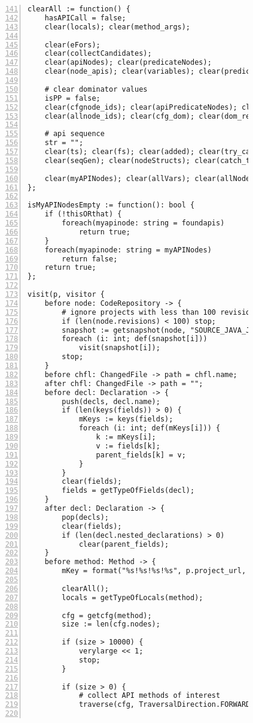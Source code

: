 \begin{figure}[ht!]
\begin{lstlisting}[numbers=left, tabsize=4, escapechar=@, caption={API Usage Mining Analysis},label={lst:aun-code},  firstline = 141, firstnumber = 141, lastline = 201]
clearAll := function() {
    hasAPICall = false;
    clear(locals); clear(method_args);
	    
	clear(eFors);
    clear(collectCandidates);
    clear(apiNodes); clear(predicateNodes); 
    clear(node_apis); clear(variables); clear(predicates);
	    
	# clear dominator values
	isPP = false;
    clear(cfgnode_ids); clear(apiPredicateNodes); clear(exits); clear(exitsT);
    clear(allnode_ids); clear(cfg_dom); clear(dom_result); clear(dom_more); clear(terminals);
	    
    # api sequence
    str = "";
    clear(ts); clear(fs); clear(added); clear(try_catch_finally); clear(catch_counts);
    clear(seqGen); clear(nodeStructs); clear(catch_types);
    
    clear(myAPINodes); clear(allVars); clear(allNodeIds); clear(hops); clear(foundapis);
};

isMyAPINodesEmpty := function(): bool {
    if (!thisORthat) {
        foreach(myapinode: string = foundapis)
            return true;
    }
    foreach(myapinode: string = myAPINodes)    
        return false;
    return true;
};

visit(p, visitor {
	before node: CodeRepository -> {
	    # ignore projects with less than 100 revisions
        if (len(node.revisions) < 100) stop;
		snapshot := getsnapshot(node, "SOURCE_JAVA_JLS");
		foreach (i: int; def(snapshot[i]))
			visit(snapshot[i]);
		stop;
	}
	before chfl: ChangedFile -> path = chfl.name;
	after chfl: ChangedFile -> path = "";
	before decl: Declaration -> {
	    push(decls, decl.name);
	    if (len(keys(fields)) > 0) {
	        mKeys := keys(fields);    
	        foreach (i: int; def(mKeys[i])) {
	        	k := mKeys[i];
	        	v := fields[k];
	            parent_fields[k] = v;
	        }
	    }
	    clear(fields);
	    fields = getTypeOfFields(decl);
	}
    after decl: Declaration -> {
        pop(decls);
        clear(fields);
        if (len(decl.nested_declarations) > 0)
            clear(parent_fields);
    }
	before method: Method -> {
	    mKey = format("%s!%s!%s!%s", p.project_url, path, peek(decls), method.name);
	    
        clearAll();
        locals = getTypeOfLocals(method);

	    cfg = getcfg(method);
	    size := len(cfg.nodes);
	    
	    if (size > 10000) {
		    verylarge << 1;
		    stop;
		}
		
		if (size > 0) {
		    # collect API methods of interest
		    traverse(cfg, TraversalDirection.FORWARD, TraversalKind.SHALLOW_ITERATIVE, collectCandidates);    
            

\end{lstlisting}
\end{figure}
